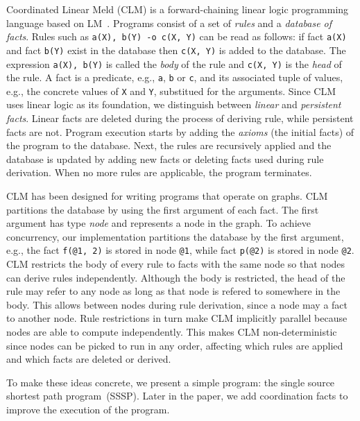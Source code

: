 Coordinated Linear Meld (CLM) is a forward-chaining linear logic programming
language based on LM~\cite{cruz-iclp14}.
Programs consist of a set of \emph{rules} and a \emph{database of facts}.
Rules such as \texttt{a(X), b(Y) -o c(X, Y)} can be read as follows: if fact \texttt{a(X)}
and fact \texttt{b(Y)} exist in the database then \texttt{c(X, Y)} is added to
the database. The expression \texttt{a(X), b(Y)} is called the \emph{body} of
the rule and \texttt{c(X, Y)} is the \emph{head} of the rule.
A fact is a predicate, e.g., \texttt{a}, \texttt{b} or \texttt{c}, and its
associated tuple of values, e.g., the concrete values of \texttt{X} and
\texttt{Y}, substitued for the
arguments. Since CLM uses linear logic as its foundation, we distinguish between
\emph{linear} and \emph{persistent facts}. Linear facts are deleted during the
process of deriving rule, while persistent facts are not.
Program execution starts by adding the \emph{axioms} (the initial facts) of the program to the database.
Next, the rules are recursively applied and the database is updated by adding
new facts or deleting facts used during rule derivation.
When no more rules are applicable, the program terminates.

CLM has been designed for writing programs that operate on graphs. CLM partitions
the database by using the first argument of each fact. The first argument has
type \emph{node} and represents a node in the graph. To achieve concurrency,
our implementation partitions the database by the first argument, e.g.,
the fact \texttt{f(@1, 2)} is stored in node \texttt{@1}, while
fact \texttt{p(@2)} is stored in node \texttt{@2}. CLM restricts the body of
every rule to facts with the same node so that nodes can derive rules
independently. Although the body is restricted, the head of the rule may refer
to any node as long as that node is refered to somewhere in the body. This allows
 between nodes during rule derivation, since a node may
 a fact to another node.  Rule restrictions in turn make CLM
implicitly parallel because nodes are able to compute independently. This makes
CLM non-deterministic since nodes can be picked to run in any order, affecting
which rules are applied and which facts are deleted or derived.

To make these ideas concrete, we present a simple
program: the single source shortest path program~(SSSP). Later in the paper, we
add coordination facts to improve the execution of the program.

